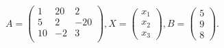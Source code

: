 \documentclass[12pt]{article}
\begin{document}
$ \begin{equation*}A=\begin{pmatrix}1 & 20 & 2 \\5 & 2 & -20 \\10 & -2 & 3 \\\end{pmatrix}, X=\begin{pmatrix}x_1 \\x_2 \\x_3\end{pmatrix}, B = \begin{pmatrix}5 \\9 \\8\end{pmatrix}.\end{equation*} $
\end{document}
